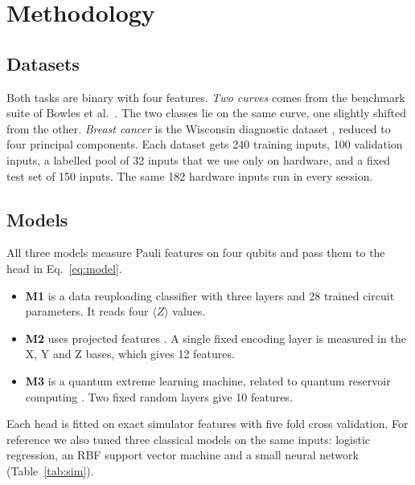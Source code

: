 \documentclass[10pt,conference]{IEEEtran}
\begin{document}
\section{Methodology}

\subsection{Datasets}
Both tasks are binary with four features. \emph{Two curves} comes from the benchmark suite of
Bowles et al.~\cite{bowles2024benchmarking}. The two classes lie on the same curve, one slightly
shifted from the other. \emph{Breast cancer} is the Wisconsin diagnostic dataset
\cite{wolberg1993breast}, reduced to four principal components. Each dataset gets 240 training
inputs, 100 validation inputs, a labelled pool of 32 inputs that we use only on hardware, and a
fixed test set of 150 inputs. The same 182 hardware inputs run in every session.

\subsection{Models}
All three models measure Pauli features on four qubits and pass them to the head in
Eq.~\eqref{eq:model}.
\begin{itemize}
\item \textbf{M1} is a data reuploading classifier \cite{perezsalinas2020reuploading} with three
layers and 28 trained circuit parameters. It reads four $\langle Z\rangle$ values.
\item \textbf{M2} uses projected features \cite{huang2021power}. A single fixed encoding layer is
measured in the X, Y and Z bases, which gives 12 features.
\item \textbf{M3} is a quantum extreme learning machine, related to quantum reservoir computing
\cite{yasuda2023qrc}. Two fixed random layers give 10 features.
\end{itemize}
Each head is fitted on exact simulator features with five fold cross validation. For reference we also tuned three classical models on the same inputs: logistic regression, an
RBF support vector machine and a small neural network (Table~\ref{tab:sim}).
\end{document}
